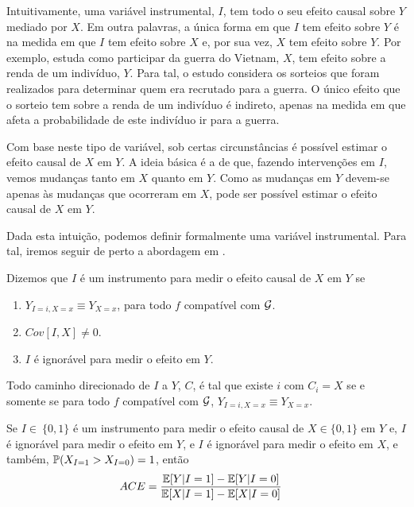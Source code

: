 Intuitivamente, uma variável instrumental, $I$, tem
todo o seu efeito causal sobre $Y$ mediado por $X$.
Em outra palavras, a única forma em que $I$ tem
efeito sobre $Y$ é na medida em que 
$I$ tem efeito sobre $X$ e, por sua vez,
$X$ tem efeito sobre $Y$.
Por exemplo, \citet{Angrist1990} estuda
como participar da guerra do Vietnam, $X$, 
tem efeito sobre a renda de um indivíduo, $Y$.
Para tal, o estudo considera 
os sorteios que foram realizados para
determinar quem era recrutado para a guerra.
O único efeito que o sorteio tem
sobre a renda de um indivíduo é indireto,
apenas na medida em que afeta
a probabilidade de este indivíduo ir para a guerra.

Com base neste tipo de variável,
sob certas circunstâncias 
é possível estimar o efeito causal de $X$ em $Y$.
A ideia básica é a de que,
fazendo intervenções em $I$,
vemos mudanças tanto em $X$ quanto em $Y$.
Como as mudanças em $Y$ devem-se apenas 
às mudanças que ocorreram em $X$,
pode ser possível estimar o efeito causal de $X$ em $Y$.

Dada esta intuição, podemos
definir formalmente uma variável instrumental.
Para tal, iremos seguir de perto 
a abordagem em \citet{Angrist1996}.

\begin{definition}
 \label{def:instrument}
 Dizemos que $I$ é um instrumento para
 medir o efeito causal de $X$ em $Y$ se
 \begin{enumerate}
  \item $Y_{I=i,X=x} \equiv Y_{X=x}$,
  para todo $f$ compatível com $\sG$.
  \item $Cov[I,X] \neq 0$.
  \item $I$ é ignorável para medir o efeito em $Y$.
 \end{enumerate}
\end{definition}

\begin{lemma}
 \label{lemma:exclusion_dag}
 Todo caminho direcionado de $I$ a $Y$, $C$,
 é tal que existe $i$ com $C_i = X$ se e somente se
 para todo $f$ compatível com $\sG$, 
 $Y_{I=i,X=x} \equiv Y_{X=x}$.
\end{lemma}

\begin{theorem}
 \label{thm:instrument}
 Se $I \in\ \{0,1\}$ é um instrumento para
 medir o efeito causal de $X \in \{0,1\}$ em $Y$ e,
 $I$ é ignorável para medir o efeito em $Y$, e
 $I$ é ignorável para medir o efeito em $X$, e
 também, $\P(X_{I=1} > X_{I=0}) = 1$, então
 \begin{align*}
  \ACE &= \frac{\E[Y|I=1]-\E[Y|I=0]}{\E[X|I=1]-\E[X|I=0]}
 \end{align*}
\end{theorem}

